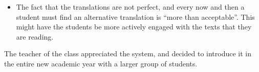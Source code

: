 \begin{itemize}
	\item The fact that the translations are not perfect, and every now and then a student must find an alternative translation is ``more than acceptable''. This might have the students be more actively engaged with the texts that they are reading. 


\end{itemize}


The teacher of the class appreciated the system, and decided to introduce it in the entire new academic year with a larger group of students. 
